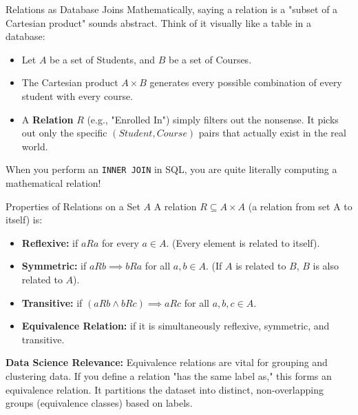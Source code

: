 \begin{intuitionbox}{Relations as Database Joins}
Mathematically, saying a relation is a "subset of a Cartesian product" sounds abstract. Think of it visually like a table in a database:
\begin{itemize}
    \item Let $A$ be a set of Students, and $B$ be a set of Courses.
    \item The Cartesian product $A \times B$ generates every possible combination of every student with every course.
    \item A \textbf{Relation} $R$ (e.g., "Enrolled In") simply filters out the nonsense. It picks out only the specific $(Student, Course)$ pairs that actually exist in the real world.
\end{itemize}
When you perform an \texttt{INNER JOIN} in SQL, you are quite literally computing a mathematical relation!
\end{intuitionbox}

\begin{definitionbox}{Properties of Relations on a Set $A$}
A relation $R \subseteq A \times A$ (a relation from set A to itself) is:
\begin{itemize}
    \item {}\textbf{Reflexive:} if $a R a$ for every $a \in A$. (Every element is related to itself).
    \item {}\textbf{Symmetric:} if $a R b \implies b R a$ for all $a, b \in A$. (If $A$ is related to $B$, $B$ is also related to $A$).
    \item {}\textbf{Transitive:} if $(a R b \land b R c) \implies a R c$ for all $a, b, c \in A$.
    \item {}\textbf{Equivalence Relation:} if it is simultaneously reflexive, symmetric, and transitive.
\end{itemize}
\end{definitionbox}

\textbf{Data Science Relevance:} Equivalence relations are vital for grouping and clustering data. If you define a relation "has the same label as," this forms an equivalence relation. It partitions the dataset into distinct, non-overlapping groups (equivalence classes) based on labels.

